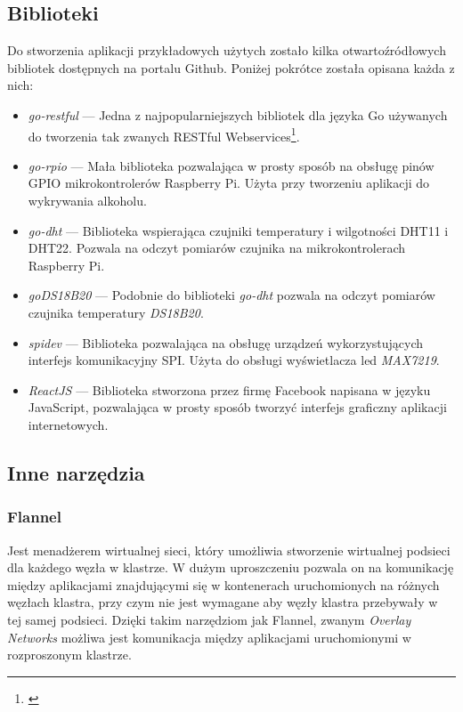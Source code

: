\documentclass[12pt]{report}
\let\Oldsubsection\subsection
\renewcommand{\subsection}{\FloatBarrier\Oldsubsection}
\let\Oldsubsubsection\subsubsection
\renewcommand{\subsubsection}{\FloatBarrier\Oldsubsubsection}
\begin{document}
{\subsection{Biblioteki}
Do stworzenia aplikacji przykładowych użytych zostało kilka otwartoźródłowych bibliotek dostępnych na portalu Github. Poniżej pokrótce została opisana każda z nich:
\begin{itemize}
\item{\textit{go-restful} --- Jedna z najpopularniejszych bibliotek dla języka Go używanych do tworzenia tak zwanych RESTful Webservices\footnote{\cite{rest}}.}
\item{\textit{go-rpio} --- Mała biblioteka pozwalająca w prosty sposób na obsługę pinów GPIO mikrokontrolerów Raspberry Pi. Użyta przy tworzeniu aplikacji do wykrywania alkoholu.}
\item{\textit{go-dht} --- Biblioteka wspierająca czujniki temperatury i wilgotności DHT11 i DHT22. Pozwala na odczyt pomiarów czujnika na mikrokontrolerach Raspberry Pi.}
\item{\textit{goDS18B20} --- Podobnie do biblioteki \textit{go-dht} pozwala na odczyt pomiarów czujnika temperatury \textit{DS18B20}.}
\item{\textit{spidev} --- Biblioteka pozwalająca na obsługę urządzeń wykorzystujących interfejs komunikacyjny SPI. Użyta do obsługi wyświetlacza led \textit{MAX7219}.}
\item{\textit{ReactJS} --- Biblioteka stworzona przez firmę Facebook napisana w języku JavaScript, pozwalająca w prosty sposób tworzyć interfejs graficzny aplikacji internetowych.}
\end{itemize}
\subsection{Inne narzędzia}
\subsubsection{Flannel}
Jest menadżerem wirtualnej sieci, który umożliwia stworzenie wirtualnej podsieci dla każdego węzła w klastrze. W dużym uproszczeniu pozwala on na komunikację między aplikacjami znajdującymi się w kontenerach uruchomionych na różnych węzłach klastra, przy czym nie jest wymagane aby węzły klastra przebywały w tej samej podsieci. Dzięki takim narzędziom jak Flannel, zwanym \textit{Overlay Networks} możliwa jest komunikacja między aplikacjami uruchomionymi w rozproszonym klastrze.
}
\end{document}
